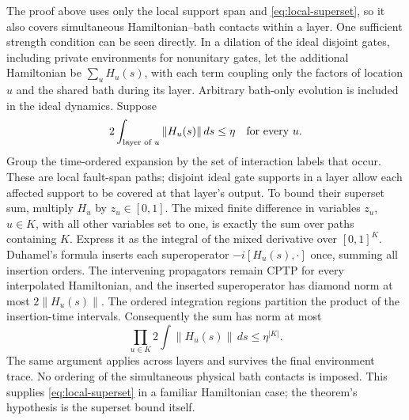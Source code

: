 The proof above uses only the local support span and \eqref{eq:local-superset}, so it also covers simultaneous Hamiltonian--bath contacts within a layer. One sufficient strength condition can be seen directly. In a dilation of the ideal disjoint gates, including private environments for nonunitary gates, let the additional Hamiltonian be $\sum_u H_u(s)$, with each term coupling only the factors of location $u$ and the shared bath during its layer. Arbitrary bath-only evolution is included in the ideal dynamics. Suppose
\[
 2\int_{\text{layer of }u}\|H_u(s)\|\,ds\le\eta
 \quad\hbox{for every }u.
\]
Group the time-ordered expansion by the set of interaction labels that occur. These are local fault-span paths; disjoint ideal gate supports in a layer allow each affected support to be covered at that layer's output. To bound their superset sum, multiply $H_u$ by $z_u\in[0,1]$. The mixed finite difference in variables $z_u$, $u\in K$, with all other variables set to one, is exactly the sum over paths containing $K$. Express it as the integral of the mixed derivative over $[0,1]^K$. Duhamel's formula inserts each superoperator $-i[H_u(s),\cdot]$ once, summing all insertion orders. The intervening propagators remain CPTP for every interpolated Hamiltonian, and the inserted superoperator has diamond norm at most $2\|H_u(s)\|$. The ordered integration regions partition the product of the insertion-time intervals. Consequently the sum has norm at most
\[
 \prod_{u\in K}2\int\|H_u(s)\|\,ds\le\eta^{|K|}.
\]
The same argument applies across layers and survives the final environment trace. No ordering of the simultaneous physical bath contacts is imposed. This supplies \eqref{eq:local-superset} in a familiar Hamiltonian case; the theorem's hypothesis is the superset bound itself.
